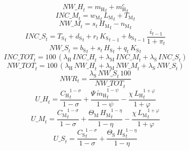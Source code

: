 \begin{dmath}
{NW\_H}_{t}={m_\mathrm{H}}_{t}+{m^c_\mathrm{H}}_{t}
\end{dmath}
\begin{dmath}
{INC\_M}_{t}={w_\mathrm{M}}_{t}\, {L_\mathrm{M}}_{t}+{T_\mathrm{M}}_{t}
\end{dmath}
\begin{dmath}
{NW\_M}_{t}={s}_{t}\, {H_\mathrm{M}}_{t}-{n_\mathrm{M}}_{t}
\end{dmath}
\begin{dmath}
{INC\_S}_{t}={T_\mathrm{S}}_{t}+{d_\mathrm{S}}_{t}+{r}_{t}\, {K_\mathrm{S}}_{t-1}+{b_\mathrm{S}}_{t-1}\, \frac{{i}_{t-1}}{1+{\pi}_{t}}
\end{dmath}
\begin{dmath}
{NW\_S}_{t}={b_\mathrm{S}}_{t}+{s}_{t}\, {H_\mathrm{S}}_{t}+{q}_{t}\, {K_\mathrm{S}}_{t}
\end{dmath}
\begin{dmath}
{INC\_TOT}_{t}=100\, \left({\lambda_\mathrm{H}}\, {INC\_H}_{t}+{\lambda_\mathrm{M}}\, {INC\_M}_{t}+{\lambda_\mathrm{S}}\, {INC\_S}_{t}\right)
\end{dmath}
\begin{dmath}
{NW\_TOT}_{t}=100\, \left({\lambda_\mathrm{H}}\, {NW\_H}_{t}+{\lambda_\mathrm{M}}\, {NW\_M}_{t}+{\lambda_\mathrm{S}}\, {NW\_S}_{t}\right)
\end{dmath}
\begin{dmath}
{NWR}_{t}=\frac{{\lambda_\mathrm{S}}\, {NW\_S}_{t}\, 100}{{NW\_TOT}_{t}}
\end{dmath}
\begin{dmath}
{U\_H}_{t}=\frac{{C_\mathrm{H}}_{t}^{1-{\sigma}}}{1-{\sigma}}+\frac{{\Psi}\, {\widetilde{m}_\mathrm{H}}_{t}^{1-{\psi}}}{1-{\psi}}-\frac{{\chi}\, {L_\mathrm{H}}_{t}^{1+{\varphi}}}{1+{\varphi}}
\end{dmath}
\begin{dmath}
{U\_M}_{t}=\frac{{C_\mathrm{M}}_{t}^{1-{\sigma}}}{1-{\sigma}}+\frac{{\Theta_\mathrm{M}}\, {H_\mathrm{M}}_{t}^{1-{\eta}}}{1-{\eta}}-\frac{{\chi}\, {L_\mathrm{M}}_{t}^{1+{\varphi}}}{1+{\varphi}}
\end{dmath}
\begin{dmath}
{U\_S}_{t}=\frac{{C_\mathrm{S}}_{t}^{1-{\sigma}}}{1-{\sigma}}+\frac{{\Theta_\mathrm{S}}\, {H_\mathrm{S}}_{t}^{1-{\eta}}}{1-{\eta}}
\end{dmath}
